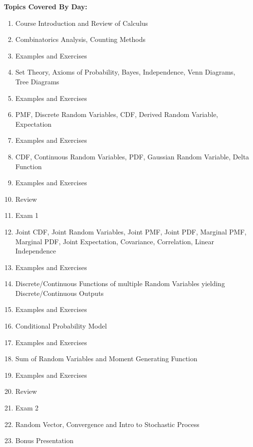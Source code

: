 \documentclass{article}
\begin{document}
\textbf{Topics Covered By Day:} {
    \begin{enumerate}
        \item Course Introduction and Review of Calculus
        \item Combinatorics Analysis, Counting Methods
        \item Examples and Exercises
        \item Set Theory, Axioms of Probability, Bayes, Independence, Venn Diagrams, Tree Diagrams
        \item Examples and Exercises
        \item PMF, Discrete Random Variables, CDF, Derived Random Variable, Expectation
        \item Examples and Exercises
        \item CDF, Continuous Random Variables, PDF, Gaussian Random Variable, Delta Function
        \item Examples and Exercises
        \item Review
        \item Exam 1
        \item Joint CDF, Joint Random Variables, Joint PMF, Joint PDF, Marginal PMF, Marginal PDF, Joint Expectation, Covariance, Correlation, Linear Independence
        \item Examples and Exercises
        \item Discrete/Continuous Functions of multiple Random Variables yielding Discrete/Continuous Outputs
        \item Examples and Exercises
        \item Conditional Probability Model
        \item Examples and Exercises
        \item Sum of Random Variables and Moment Generating Function
        \item Examples and Exercises
        \item Review
        \item Exam 2
        \item Random Vector, Convergence and Intro to Stochastic Process
        \item Bonus Presentation
    \end{enumerate}
}
\end{document}
